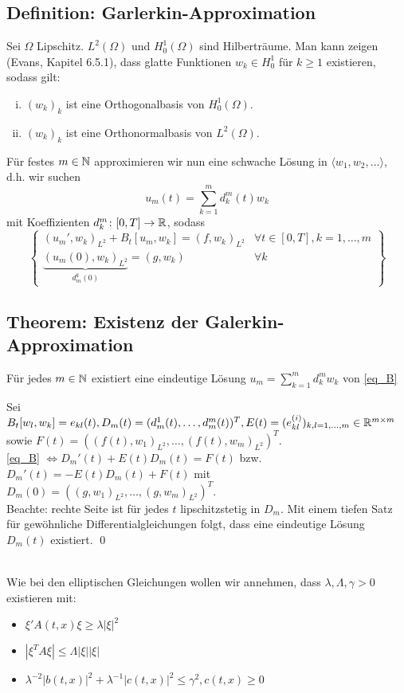 \subsection{Definition: Garlerkin-Approximation}
Sei $\Omega$ Lipschitz. $L^2(\Omega)$ und $H_0^1(\Omega)$ sind Hilberträume. Man kann zeigen (Evans, Kapitel 6.5.1), dass glatte Funktionen $w_k \in H_0^1$ für $k \geq 1$ existieren, sodass gilt:
\begin{enumerate}[(i)]
	\item $(w_k)_k$ ist eine Orthogonalbasis von $H_0^1(\Omega)$.
	\item $(w_k)_k$ ist eine Orthonormalbasis von $L^2(\Omega)$.
\end{enumerate}
Für festes $m \in \mathbb{N}$ approximieren wir nun eine schwache Lösung in $\langle w_1,w_2,\dots \rangle$, d.h. wir suchen
\[ u_m(t) = \sum\limits_{k=1}^{m} d_k^m(t) w_k \]
mit Koeffizienten $d_k^m \colon [0,T] \rightarrow \mathbb{R}$, sodass
\begin{equation}
	\left. \begin{cases}
	(u_m',w_k)_{L^2} + B_t [u_m,w_k] = (f,w_k)_{L^2} & \forall t \in [0,T], k = 1,\dots,m \\ 
	\underbrace{(u_m(0),w_k)_{L^2}}_{d_m^k (0)} = (g,w_k) & \forall k
	\end{cases} \right\} \label{eq_B}
\end{equation}

\subsection{Theorem: Existenz der Galerkin-Approximation}
	Für jedes $m \in \mathbb{N}$ existiert eine eindeutige Lösung $u_m = \sum_{k=1}^{m} d_k^m w_k$ von \eqref{eq_B}
	
	Sei $B_t[w_l,w_k] = e_{kl}(t), D_m(t) = (d_m^1(t), \dots, d_m^m(t))^T, E(t) = (e_{kl}^{(i)})_{k,l = 1,\dots,m} \in \mathbb{R}^{m \times m}$ sowie \linebreak
	$F(t) = ( (f(t),w_1)_{L^2},\dots,(f(t),w_m)_{L^2} )^T$. \\
	\eqref{eq_B} $\Leftrightarrow D_m'(t) + E(t) D_m(t) = F(t)$ bzw. $D_m'(t) = -E(t) D_m(t) + F(t)$ mit $D_m(0) = ( (g,w_1)_{L^2}, \dots, (g,w_m)_{L^2})^T$.\\
	Beachte: rechte Seite ist für jedes $t$ lipschitzstetig in $D_m$. Mit einem tiefen Satz für gewöhnliche Differentialgleichungen folgt, dass eine eindeutige Lösung $D_m(t)$ existiert. \qed
	
\mbox{} \\
Wie bei den elliptischen Gleichungen wollen wir annehmen, dass $\lambda, \Lambda, \gamma > 0$ existieren mit: \begin{itemize}
	\item $\xi' A(t,x) \xi \geq \lambda |\xi|^2$
	\item $| \xi^TA \xi| \leq \Lambda |\xi||\xi|$
	\item $\lambda^{-2} |b(t,x)|^2 + \lambda^{-1} |c(t,x)|^2 \leq \gamma^2, c(t,x) \geq 0$
\end{itemize}

